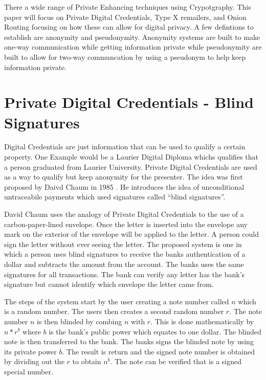 \documentclass[12pt]{article}
\begin{document}
There a wide range of Private Enhancing techniques using Crypotgraphy. This paper will focus on Private Digital Credentials, Type X remailers, and Onion Routing focusing on how these can allow for digital privacy. A few defintions to establish are anonymity and pseudonymity. Anonymity systems are built to make one-way communication while getting information private while pseudonymity are built to allow for two-way communcation by using a pseudonym to help keep information private. \cite{GoldbergTwo}

\section{Private Digital Credentials - Blind Signatures}\label{sec:PDC}
Digital Credentials are just information that can be used to qualify a certain property. One Example would be a Laurier Digital Diploma whichs qualifies that a person graduated from Laurier University.  Private Digital Credentials are used as a way to qualify but keep anonymity for the presenter. The idea was first proposed by Daivd Chaum in 1985 \cite{Chaum}. He introduces the idea of unconditional untraceabile payments which used signatures called ``blind signatures''\cite{Chaum}. 

David Chaum uses the analogy of Private Digital Credentials to the use of a carbon-paper-lined envelope. Once the letter is inserted into the envelope any mark on the exterior of the envelope will be applied to the letter. A person could sign the letter without ever seeing the letter. The proposed system is one in which a person uses blind signatures to receive the banks authentication of a dollar and subtracts the amount from the account. The banks uses the same signatures for all transactions. The bank can verify any letter has the bank's signature but cannot identify which envelope the letter came from.

The steps of the system start by the user creating a note number called $n$ which is a random number. The users then creates a second random number  $r$. The note number $n$ is then blinded by combing $n$ with $r$. This is done mathematically by $n * r^b$ where $b$ is the bank's public power which equates to one dollar. The blinded note is then transferred to the bank. The banks signs the blinded note by using its private power $\overline{b}$. The result is return and the signed note number is obtained by dividing out the $r$ to obtain $n^{\overline{b}}$. The note can be verified that is a signed special number.
\end{document}
